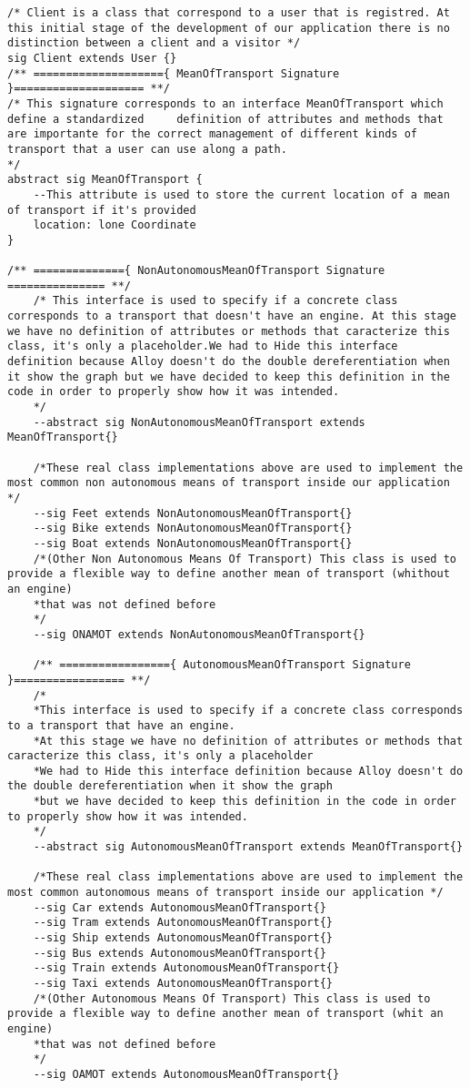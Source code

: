 \documentclass[a4paper,leqno]{book}
\begin{document}
\begin{lstlisting}
/* Client is a class that correspond to a user that is registred. At this initial stage of the development of our application there is no distinction between a client and a visitor */
sig Client extends User {}
/** ===================={ MeanOfTransport Signature }==================== **/
/* This signature corresponds to an interface MeanOfTransport which define a standardized     definition of attributes and methods that are importante for the correct management of different kinds of transport that a user can use along a path.
*/
abstract sig MeanOfTransport {
	--This attribute is used to store the current location of a mean of transport if it's provided
	location: lone Coordinate
}

/** =============={ NonAutonomousMeanOfTransport Signature =============== **/
	/* This interface is used to specify if a concrete class corresponds to a transport that doesn't have an engine. At this stage we have no definition of attributes or methods that caracterize this class, it's only a placeholder.We had to Hide this interface definition because Alloy doesn't do the double dereferentiation when it show the graph but we have decided to keep this definition in the code in order to properly show how it was intended.
	*/
	--abstract sig NonAutonomousMeanOfTransport extends MeanOfTransport{}
	
	/*These real class implementations above are used to implement the most common non autonomous means of transport inside our application */
	--sig Feet extends NonAutonomousMeanOfTransport{}
	--sig Bike extends NonAutonomousMeanOfTransport{}
	--sig Boat extends NonAutonomousMeanOfTransport{}
	/*(Other Non Autonomous Means Of Transport) This class is used to provide a flexible way to define another mean of transport (whithout an engine)
	*that was not defined before
	*/
	--sig ONAMOT extends NonAutonomousMeanOfTransport{}
	
	/** ================={ AutonomousMeanOfTransport Signature }================= **/
	/*
	*This interface is used to specify if a concrete class corresponds to a transport that have an engine.
	*At this stage we have no definition of attributes or methods that caracterize this class, it's only a placeholder
	*We had to Hide this interface definition because Alloy doesn't do the double dereferentiation when it show the graph
	*but we have decided to keep this definition in the code in order to properly show how it was intended.
	*/
	--abstract sig AutonomousMeanOfTransport extends MeanOfTransport{}
	
	/*These real class implementations above are used to implement the most common autonomous means of transport inside our application */
	--sig Car extends AutonomousMeanOfTransport{}
	--sig Tram extends AutonomousMeanOfTransport{}
	--sig Ship extends AutonomousMeanOfTransport{}
	--sig Bus extends AutonomousMeanOfTransport{}
	--sig Train extends AutonomousMeanOfTransport{}
	--sig Taxi extends AutonomousMeanOfTransport{}
	/*(Other Autonomous Means Of Transport) This class is used to provide a flexible way to define another mean of transport (whit an engine)
	*that was not defined before
	*/
	--sig OAMOT extends AutonomousMeanOfTransport{}
	

\end{lstlisting}
\end{document}
